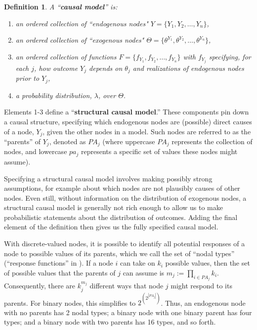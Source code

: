 \documentclass[
  11pt,
  article]{jss}
\newtheorem{definition}{Definition}
\begin{document}
\begin{definition}
  
  A ``\textbf{causal model}'' is:
  \begin{enumerate}
    \item an ordered collection of ``endogenous nodes" $Y = \{Y_1, Y_2, \dots, Y_n\}$,
    \item an ordered collection of ``exogenous nodes" $\Theta = \{\theta^{Y_1}, \theta^{Y_2}, \dots, \theta^{Y_n}\}$,
    \item an ordered collection of functions $F = \{f_{Y_1}, f_{Y_2}, \dots, f_{Y_n}\}$ with $f_{Y_j}$ specifying, for each $j$, how outcome $Y_j$ depends on $\theta_j$ and realizations of endogenous nodes prior to $Y_j$,
    \item a probability distribution, $\lambda$, over $\Theta$.
  \end{enumerate}
  
\end{definition}

Elements 1-3 define a ``\textbf{structural causal model}.'' These
components pin down a causal structure, specifying which endogenous
nodes are (possible) direct causes of a node, \(Y_j\), given the other
nodes in a model. Such nodes are referred to as the ``parents'' of
\(Y_j\), denoted as \(PA_j\) (where uppercase \(PA_j\) represents the
collection of nodes, and lowercase \(pa_j\) represents a specific set of
values these nodes might assume).

Specifying a structural causal model involves making possibly strong
assumptions, for example about which nodes are not plausibly causes of
other nodes. Even still, without information on the distribution of
exogenous nodes, a structural causal model is generally not rich enough
to allow us to make probabilistic statements about the distribution of
outcomes. Adding the final element of the definition then gives us the
fully specified causal model.

With discrete-valued nodes, it is possible to identify all potential
responses of a node to possible values of its parents, which we call the
set of ``nodal types'' (``response functions'' in
\citet{pearl_causality_2009}). If a node \(i\) can take on \(k_i\)
possible values, then the set of possible values that the parents of
\(j\) can assume is \(m_j :=\prod_{i\in PA_j}k_i\). Consequently, there
are \(k_j^{m_j}\) different ways that node \(j\) might respond to its
parents. For binary nodes, this simplifies to
\(2^{\left(2^{|PA_j|}\right)}\). Thus, an endogenous node with no
parents has 2 nodal types; a binary node with one binary parent has four
types; and a binary node with two parents has 16 types, and so forth.
\end{document}
